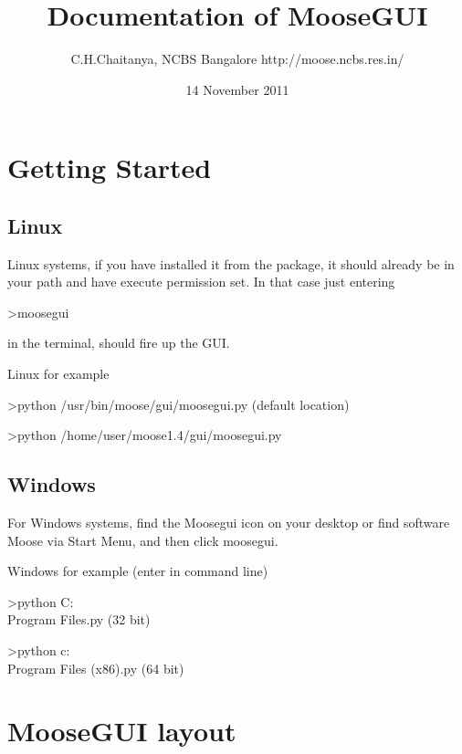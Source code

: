 \documentclass[11pt]{article}
\title{Documentation of MooseGUI }
\author{C.H.Chaitanya, NCBS Bangalore http://moose.ncbs.res.in/}
\date{14 November 2011}
\begin{document}
\maketitle

\setcounter{tocdepth}{3}
\tableofcontents
\vspace*{1cm}









\section{Getting Started}
\label{sec-1}


\subsection{Linux}
\label{sec-1.1}


  Linux systems, if you have installed it from the package, it should already be in your path and have execute permission set. In that case just entering

  >moosegui 

  in the terminal, should fire up the GUI.   

  Linux for example 

  >python /usr/bin/moose/gui/moosegui.py (default location)

  >python /home/user/moose1.4/gui/moosegui.py

\subsection{Windows}
\label{sec-1.2}


  For Windows systems, find the Moosegui icon on your desktop or find software Moose via Start Menu, and then click moosegui.

  Windows for example (enter in command line)

  >python C:\\Program Files\MOOSE\gui\moosegui.py (32 bit)

  >python c:\\Program Files (x86)\MOOSEgui\moosegui.py (64 bit)

\section{MooseGUI layout}
\label{sec-2}
\end{document}
